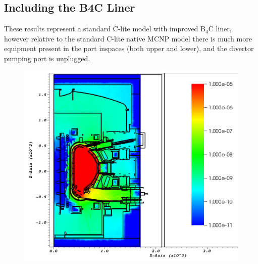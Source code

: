 \documentclass[12pt]{article}
\begin{document}
\subsection{Including the B4C Liner}
These results represent a standard C-lite model with improved B$_4$C liner,
however relative to the standard C-lite native MCNP model there is much more
equipment present in the port inspaces (both upper and lower), and the divertor
pumping port is unplugged. 
\begin{figure}[ht!]
  \centering
  \includegraphics[scale=0.35]{../plots/neutron/b4c/flux_y0.png}     

\end{figure}
\end{document}
